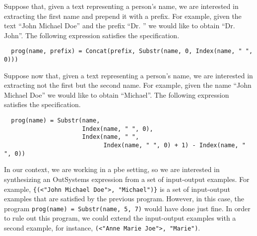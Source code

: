 \begin{example}\label{ex:first-name}
  Suppose that, given a text representing a person's name, we are interested in
extracting the first name and prepend it with a prefix. For example, given the
text ``John Michael Doe'' and the prefix ``Dr. '' we would like to obtain
``Dr. John''. The following expression satisfies the specification.
 
\begin{lstlisting}
  prog(name, prefix) = Concat(prefix, Substr(name, 0, Index(name, " ", 0)))
\end{lstlisting}
\end{example}

\begin{example}\label{ex:second-name}
  Suppose now that, given a text representing a person's name, we are interested
in extracting not the first but the second name. For example, given the name
``John Michael Doe'' we would like to obtain ``Michael''. The following
expression satisfies the specification.
 
\begin{lstlisting}
  prog(name) = Substr(name,
                      Index(name, " ", 0),
                      Index(name, " ",
                            Index(name, " ", 0) + 1) - Index(name, " ", 0))
\end{lstlisting}
\end{example}

In our context, we are working in a \gls{pbe} setting, so we are interested in
synthesizing an OutSystems expression from a set of input-output examples.
For example, \lstinline|{(<"John Michael Doe">, "Michael")}|
is a set of input-output examples that are satisfied by the previous program.
However, in this case, the program \lstinline|prog(name) = Substr(name, 5, 7)|
would have done just fine.
In order to rule out this program, we could extend the input-output examples
with a second example, for instance, \lstinline|(<"Anne Marie Joe">, "Marie")|.

